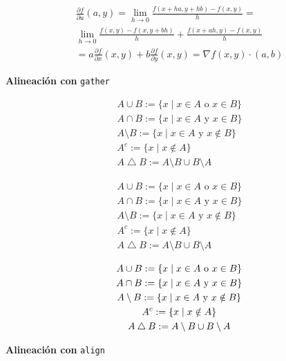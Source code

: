 \documentclass[12pt]{book}
\newcommand{\tto}{\longrightarrow}
\newcommand{\parcial}[2]{\frac{\partial#1}{\partial#2}}
\begin{document}
\begin{multline*}
	\parcial {f}{u}(a,y)=\lim\limits_{h\tto 0}\frac{f(x+h a,y+hb)-f(x,y)}{h}=\\
	\lim\limits_{h\tto 0}\frac{f(x,y)-f(x,y+bh)}{h}+\frac{f(x+ah,y)-f(x,y)}{h}\\
	=a\parcial{f}{x}(x,y)+b\parcial{f}{y}(x,y)=\nabla f(x,y)\cdot (a,b)
\end{multline*}



\noindent\textbf{Alineación con } \verb*|gather|

\begin{gather}
	A\cup B:=\{x\mid x\in A \text{ o } x\in B\}\\
	A\cap B:=\{x\mid x\in A \text{ y } x\in B\} \\
		A\setminus B:=\{x\mid x\in A \text{ y } x\notin B\}\\
	A^{c}:=\{x\mid x\notin A \} \\
		A\bigtriangleup  B:=A\setminus B\cup B\setminus A
\end{gather}




\begin{gather*}
	A\cup B:=\{x\mid x\in A \text{ o } x\in B\}\\
	A\cap B:=\{x\mid x\in A \text{ y } x\in B\} \\
	A\setminus B:=\{x\mid x\in A \text{ y } x\notin B\}\\
	A^{c}:=\{x\mid x\notin A \} \\
	A\bigtriangleup  B:=A\setminus B\cup B\setminus A
\end{gather*}


\begin{gather}
	A\cup B:=\{x\mid x\in A \text{ o } x\in B\}\\
	A\cap B:=\{x\mid x\in A \text{ y } x\in B\} \\
\notag	A\setminus B:=\{x\mid x\in A \text{ y } x\notin B\}\\ 
\notag A^{c}:=\{x\mid x\notin A \} \\
\notag	A\bigtriangleup  B:=A\setminus B\cup B\setminus A
\end{gather}


\noindent\textbf{Alineación con} \verb*|align|
\end{document}
